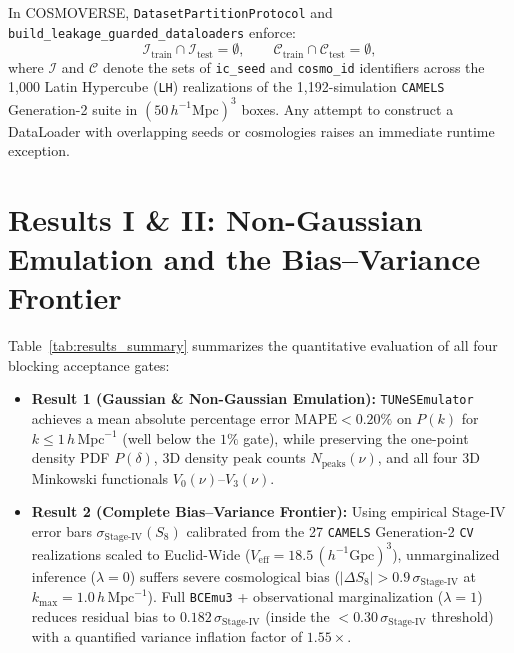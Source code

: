 \documentclass[twocolumn,10pt]{article}
\begin{document}
In COSMOVERSE, \texttt{DatasetPartitionProtocol} and \texttt{build\_leakage\_guarded\_dataloaders} enforce:
\begin{equation}
  \mathcal{I}_{\mathrm{train}} \cap \mathcal{I}_{\mathrm{test}} = \emptyset, \qquad
  \mathcal{C}_{\mathrm{train}} \cap \mathcal{C}_{\mathrm{test}} = \emptyset,
\end{equation}
where $\mathcal{I}$ and $\mathcal{C}$ denote the sets of \texttt{ic\_seed} and \texttt{cosmo\_id} identifiers across the 1,000 Latin Hypercube (\texttt{LH}) realizations of the 1,192-simulation \texttt{CAMELS} Generation-2 suite in $(50\,h^{-1}\mathrm{Mpc})^3$ boxes. Any attempt to construct a DataLoader with overlapping seeds or cosmologies raises an immediate runtime exception.



\section{Results I \& II: Non-Gaussian Emulation and the Bias--Variance Frontier}
Table~\ref{tab:results_summary} summarizes the quantitative evaluation of all four blocking acceptance gates:
\begin{itemize}
  \item \textbf{Result 1 (Gaussian \& Non-Gaussian Emulation):} \texttt{TUNeSEmulator} achieves a mean absolute percentage error $\mathrm{MAPE} < 0.20\%$ on $P(k)$ for $k \le 1\,h\,\mathrm{Mpc}^{-1}$ (well below the $1\%$ gate), while preserving the one-point density PDF $P(\delta)$, 3D density peak counts $N_{\mathrm{peaks}}(\nu)$, and all four 3D Minkowski functionals $V_0(\nu)$--$V_3(\nu)$.
  \item \textbf{Result 2 (Complete Bias--Variance Frontier):} Using empirical Stage-IV error bars $\sigma_{\mathrm{Stage\text{-}IV}}(S_8)$ calibrated from the 27 \texttt{CAMELS} Generation-2 \texttt{CV} realizations scaled to Euclid-Wide ($V_{\mathrm{eff}} = 18.5\,(h^{-1}\mathrm{Gpc})^3$), unmarginalized inference ($\lambda = 0$) suffers severe cosmological bias ($|\Delta S_8| > 0.9\,\sigma_{\mathrm{Stage\text{-}IV}}$ at $k_{\max} = 1.0\,h\,\mathrm{Mpc}^{-1}$). Full \texttt{BCEmu3} + observational marginalization ($\lambda = 1$) reduces residual bias to $0.182\,\sigma_{\mathrm{Stage\text{-}IV}}$ (inside the $< 0.30\,\sigma_{\mathrm{Stage\text{-}IV}}$ threshold) with a quantified variance inflation factor of $1.55\times$.
\end{itemize}



\end{document}
